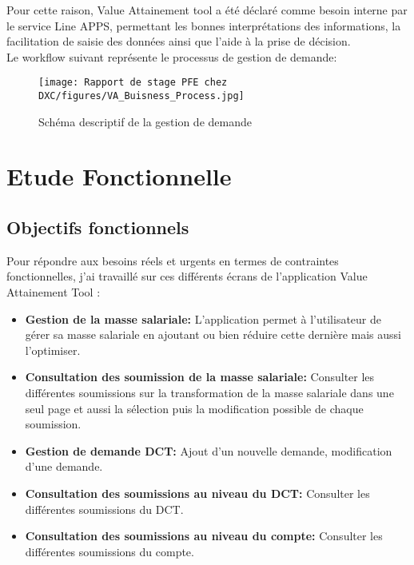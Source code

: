Pour cette raison, Value Attainement tool a été déclaré comme besoin interne par le service Line APPS, permettant les bonnes interprétations des informations, la facilitation de saisie des données ainsi que l’aide à la prise de décision.
\\

Le workflow suivant représente le processus de gestion de demande:


\begin{figure}[!h]
    \centering
    \texttt{[image: Rapport de stage PFE chez DXC/figures/VA\_Buisness\_Process.jpg]}
    \caption{Schéma descriptif de la gestion de demande}
\end{figure}

\newpage
\section{Etude Fonctionnelle}

\subsection{Objectifs fonctionnels}

Pour répondre aux besoins réels et urgents en termes de contraintes fonctionnelles, j'ai travaillé sur ces différents écrans de l'application Value Attainement Tool :
\\
\begin{itemize}
    \item \textbf{Gestion de la masse salariale:} L'application permet à l'utilisateur de gérer sa masse salariale en ajoutant ou bien réduire cette dernière mais aussi l'optimiser.
    
    \item \textbf{Consultation des soumission de la masse salariale:} Consulter les différentes soumissions sur la transformation de la masse salariale dans une seul page et aussi la sélection puis la modification possible de chaque soumission.
    
    \item \textbf{Gestion de demande DCT:} Ajout d'un nouvelle demande, modification d'une demande.
    
    \item \textbf{Consultation des soumissions au niveau du DCT:} Consulter les différentes soumissions du DCT.
    
    \item \textbf{Consultation des soumissions au niveau du compte:} Consulter les différentes soumissions du compte.
    
\end{itemize}

